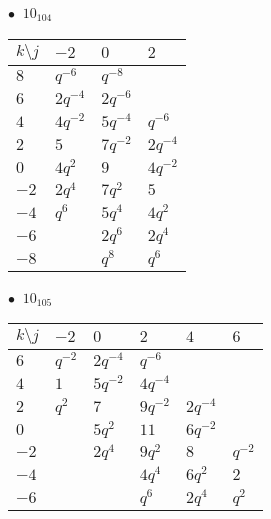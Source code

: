 \begin{minipage}{\linewidth}
$\bullet\ $ $10_{104}$ \vspace{0.5em} \\
\begin{tabular}{l|lll}
$k \setminus j$ & $-2$ & $0$ & $2$ \\
\hline
$8$ & $q^{-6}$ & $q^{-8}$ &  \\
$6$ & $2q^{-4}$ & $2q^{-6}$ &  \\
$4$ & $4q^{-2}$ & $5q^{-4}$ & $q^{-6}$ \\
$2$ & $5$ & $7q^{-2}$ & $2q^{-4}$ \\
$0$ & $4q^{2}$ & $9$ & $4q^{-2}$ \\
$-2$ & $2q^{4}$ & $7q^{2}$ & $5$ \\
$-4$ & $q^{6}$ & $5q^{4}$ & $4q^{2}$ \\
$-6$ &  & $2q^{6}$ & $2q^{4}$ \\
$-8$ &  & $q^{8}$ & $q^{6}$ \\
\end{tabular}
\vspace{2em}
\end{minipage}
%
\begin{minipage}{\linewidth}
$\bullet\ $ $10_{105}$ \vspace{0.5em} \\
\begin{tabular}{l|lllll}
$k \setminus j$ & $-2$ & $0$ & $2$ & $4$ & $6$ \\
\hline
$6$ & $q^{-2}$ & $2q^{-4}$ & $q^{-6}$ &  &  \\
$4$ & $1$ & $5q^{-2}$ & $4q^{-4}$ &  &  \\
$2$ & $q^{2}$ & $7$ & $9q^{-2}$ & $2q^{-4}$ &  \\
$0$ &  & $5q^{2}$ & $11$ & $6q^{-2}$ &  \\
$-2$ &  & $2q^{4}$ & $9q^{2}$ & $8$ & $q^{-2}$ \\
$-4$ &  &  & $4q^{4}$ & $6q^{2}$ & $2$ \\
$-6$ &  &  & $q^{6}$ & $2q^{4}$ & $q^{2}$ \\
\end{tabular}
\vspace{2em}
\end{minipage}
%
